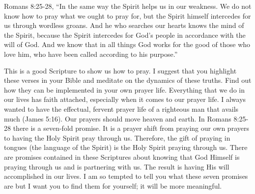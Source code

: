 \documentclass[oneside]{book}
\begin{document}
Romans 8:25-28, “In the same way the Spirit helps us in our weakness. We do not know how to pray what we ought to pray for, but the Spirit himself intercedes for us through wordless groans. And he who searches our hearts knows the mind of the Spirit, because the Spirit intercedes for God’s people in accordance with the will of God. And we know that in all things God works for the good of those who love him, who have been called according to his purpose.” 

This is a good Scripture to show us how to pray. I suggest that you highlight these verses in your Bible and meditate on the dynamics of these truths. Find out how they can be implemented in your own prayer life. Everything that we do in our lives has faith attached, especially when it comes to our prayer life. I always wanted to have the effectual, fervent prayer life of a righteous man that avails much (James 5:16). Our prayers should move heaven and earth. In Romans 8:25-28 there is a seven-fold promise. It is a prayer shift from praying our own prayers to having the Holy Spirit pray through us. Therefore, the gift of praying in tongues (the language of the Spirit) is the Holy Spirit praying through us. There are promises contained in these Scriptures about knowing that God Himself is praying through us and is partnering with us. The result is having His will accomplished in our lives. I am so tempted to tell you what these seven promises are but I want you to find them for yourself; it will be more meaningful.
\end{document}
